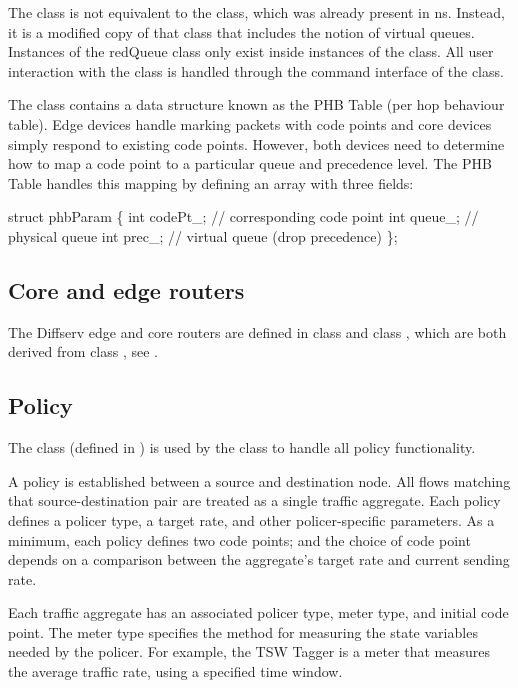 The  class is not equivalent to the  class, 
which was already 
present in ns.  Instead, it is a modified copy of that class that includes the 
notion of virtual queues.
Instances of the redQueue class only exist inside instances of the 
 class.  All user interaction with the  class 
is handled through the command interface of the  class.

The  class contains a data structure known as the PHB Table 
(per hop behaviour table).  Edge devices handle marking packets with code 
points and core devices simply respond to existing code points.  However, 
both devices need to determine how to map a code point to a particular queue 
and precedence level. The PHB Table handles this mapping by defining an array 
with three fields:

\begin{program}
struct phbParam \{
   int codePt_; // corresponding code point
   int queue_;	// physical queue
   int prec_;	// virtual queue (drop precedence)
\};
\end{program}


\subsection{Core and edge routers}
\label{sec:dsedge}
The Diffserv edge and core routers are defined in class  and 
class , which are both derived from class ,
see . 

\subsection{Policy}
\label{sec:dspolicy}
The class  (defined in ) is used by the 
class  to handle all policy functionality.

A policy is established between a source and destination node.  All flows 
matching that source-destination pair are treated as a single traffic 
aggregate.
Each policy defines a policer type, a target rate, and other policer-specific 
parameters.  As a minimum, each policy defines two code points; and the choice 
of code point depends on a comparison between the aggregate's target rate and 
current sending rate.

Each traffic aggregate has an associated policer type, meter type, and initial 
code point.  The meter type specifies the method for measuring the state 
variables needed by the policer.  For example, the TSW Tagger is a meter that 
measures the average traffic rate, using a specified time window.


